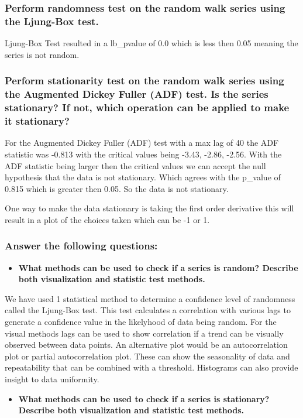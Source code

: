 \documentclass{article}
\begin{document}
\subsubsection{Perform randomness test on the random walk series using the Ljung-Box test.}

Ljung-Box Test resulted in a lb\_pvalue of 0.0 which is less then 0.05 meaning the series is not random.
\subsubsection{Perform stationarity test on the random walk series using the Augmented Dickey
Fuller (ADF) test. Is the series stationary? If not, which operation can be applied
 to make it stationary?}
 
For the Augmented Dickey Fuller (ADF) test with a max lag of 40 the ADF statistic was -0.813 with the critical values being -3.43, -2.86, -2.56. With the ADF statistic being larger then the critical values we can accept the null hypothesis that the data is not stationary. Which agrees with the p\_value of 0.815 which is greater then 0.05. So the data is not stationary.

One way to make the data stationary is taking the first order derivative this will result in a plot of the choices taken which can be -1 or 1.
\subsubsection*{Answer the following questions:}
\begin{itemize}
    \item \textbf{What methods can be used to check if a series is random? Describe both visualization and statistic test methods.}
\end{itemize}
We have used 1 statistical method to determine a confidence level of randomness called the Ljung-Box test. This test calculates a correlation with various lags to generate a confidence value in the likelyhood of data being random.
For the visual methods lags can be used to show correlation if a trend can be visually observed between data points. An alternative plot would be an autocorrelation plot or partial autocorrelation plot. These can show the seasonality of data and repeatability that can be combined with a threshold. Histograms can also provide insight to data uniformity.
\begin{itemize}
    \item \textbf{What methods can be used to check if a series is stationary? Describe both visualization and statistic test methods.}
\end{itemize}
\end{document}

